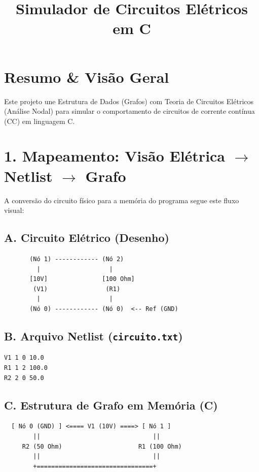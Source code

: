 \documentclass[12pt]{article}
\title{\textbf{Simulador de Circuitos Elétricos em C}}
\author{} %
\date{}
\begin{document}
\maketitle

\section*{Resumo \& Visão Geral}
Este projeto une Estrutura de Dados (Grafos) com Teoria de Circuitos Elétricos (Análise Nodal) para simular o comportamento de circuitos de corrente contínua (CC) em linguagem C.

\section{1. Mapeamento: Visão Elétrica \texorpdfstring{$\rightarrow$}{->} Netlist \texorpdfstring{$\rightarrow$}{->} Grafo}

A conversão do circuito físico para a memória do programa segue este fluxo visual:

\subsection*{A. Circuito Elétrico (Desenho)}
\begin{verbatim}
       (Nó 1) ------------ (Nó 2)
         |                   |
       [10V]               [100 Ohm]
        (V1)                (R1)
         |                   |
       (Nó 0) ------------ (Nó 0)  <-- Ref (GND)
\end{verbatim}

\subsection*{B. Arquivo Netlist (\texttt{circuito.txt})}
\begin{verbatim}
V1 1 0 10.0
R1 1 2 100.0
R2 2 0 50.0
\end{verbatim}

\subsection*{C. Estrutura de Grafo em Memória (C)}
\begin{verbatim}
  [ Nó 0 (GND) ] <==== V1 (10V) ====> [ Nó 1 ]
        ||                               ||
     R2 (50 Ohm)                     R1 (100 Ohm)
        ||                               ||
        +================================+
\end{verbatim}
\end{document}
